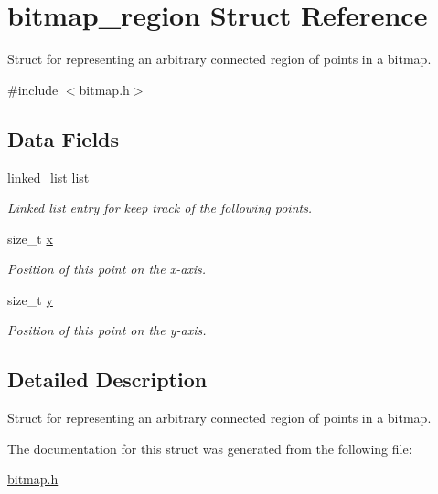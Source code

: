 \hypertarget{structbitmap__region}{
\section{bitmap\_\-region Struct Reference}
\label{structbitmap__region}
}


Struct for representing an arbitrary connected region of points in a bitmap.  




{\ttfamily \#include $<$bitmap.h$>$}

\subsection*{Data Fields}
\begin{DoxyCompactItemize}
\item 
\hypertarget{structbitmap__region_a2f236b8dc85d0b9d2c62c145fe1cefb4}{
\hyperlink{structlinked__list}{linked\_\-list} \hyperlink{structbitmap__region_a2f236b8dc85d0b9d2c62c145fe1cefb4}{list}}
\label{structbitmap__region_a2f236b8dc85d0b9d2c62c145fe1cefb4}

\begin{DoxyCompactList}\small\item\em Linked list entry for keep track of the following points. \end{DoxyCompactList}\item 
\hypertarget{structbitmap__region_af4f148acb68b8bac593bcb9dfad4825f}{
size\_\-t \hyperlink{structbitmap__region_af4f148acb68b8bac593bcb9dfad4825f}{x}}
\label{structbitmap__region_af4f148acb68b8bac593bcb9dfad4825f}

\begin{DoxyCompactList}\small\item\em Position of this point on the x-\/axis. \end{DoxyCompactList}\item 
\hypertarget{structbitmap__region_ad2d6fb89dd8775c85f574f5c56fc6e2b}{
size\_\-t \hyperlink{structbitmap__region_ad2d6fb89dd8775c85f574f5c56fc6e2b}{y}}
\label{structbitmap__region_ad2d6fb89dd8775c85f574f5c56fc6e2b}

\begin{DoxyCompactList}\small\item\em Position of this point on the y-\/axis. \end{DoxyCompactList}\end{DoxyCompactItemize}


\subsection{Detailed Description}
Struct for representing an arbitrary connected region of points in a bitmap. 

The documentation for this struct was generated from the following file:\begin{DoxyCompactItemize}
\item 
\hyperlink{bitmap_8h}{bitmap.h}\end{DoxyCompactItemize}
